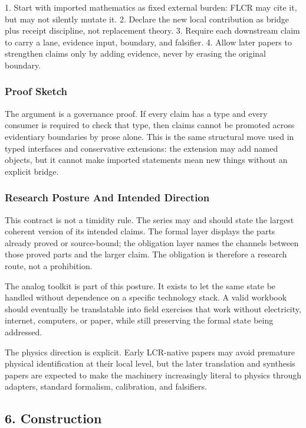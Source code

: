 \documentclass[11pt]{article}
\begin{document}
1. Start with imported mathematics as fixed external burden: FLCR may cite it, but may not silently mutate it.
2. Declare the new local contribution as bridge plus receipt discipline, not replacement theory.
3. Require each downstream claim to carry a lane, evidence input, boundary, and falsifier.
4. Allow later papers to strengthen claims only by adding evidence, never by erasing the original boundary.

\subsubsection*{Proof Sketch}

The argument is a governance proof. If every claim has a type and every consumer is required to check that type, then claims cannot be promoted across evidentiary boundaries by prose alone. This is the same structural move used in typed interfaces and conservative extensions: the extension may add named objects, but it cannot make imported statements mean new things without an explicit bridge.

\subsubsection*{Research Posture And Intended Direction}

This contract is not a timidity rule. The series may and should state the
largest coherent version of its intended claims. The formal layer displays the
parts already proved or source-bound; the obligation layer names the channels
between those proved parts and the larger claim. The obligation is therefore a
research route, not a prohibition.

The analog toolkit is part of this posture. It exists to let the same state be
handled without dependence on a specific technology stack. A valid workbook
should eventually be translatable into field exercises that work without
electricity, internet, computers, or paper, while still preserving the formal
state being addressed.

The physics direction is explicit. Early LCR-native papers may avoid premature
physical identification at their local level, but the later translation and
synthesis papers are expected to make the machinery increasingly literal to
physics through adapters, standard formalism, calibration, and falsifiers.

\subsection*{6. Construction}
\end{document}
